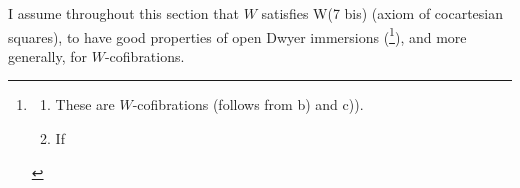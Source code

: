 \documentclass[11pt]{article}
\begin{document}
{\reversemarginpar\marginnote{\textbar\textbar\textbar}}I assume throughout this section that $W$ satisfies W(7 bis) (axiom of cocartesian squares), to have good properties of open Dwyer immersions (\footnote[124]{\begin{enumerate}
\item[a)] These are $W$-cofibrations (follows from b) and c)).
\item[b)] If
\end{enumerate}}), and more generally, for $W$-cofibrations. %
\end{document}
